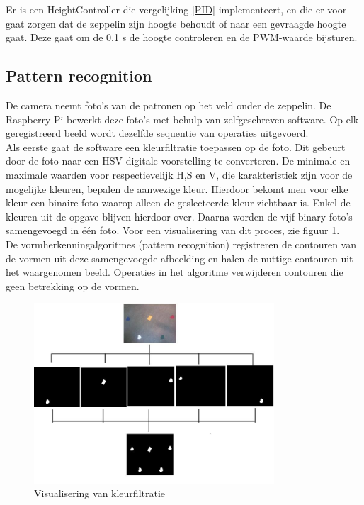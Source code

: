 \documentclass[eind]{penoverslag}
\begin{document}
Er is een HeightController die vergelijking \eqref{PID} implementeert, en die er voor gaat zorgen dat de zeppelin zijn hoogte behoudt of naar een gevraagde hoogte gaat. Deze gaat om de 0.1 s de hoogte controleren en de PWM-waarde bijsturen. \\



\subsection{Pattern recognition}
De camera neemt foto’s van de patronen op het veld onder de zeppelin. De Raspberry Pi bewerkt deze foto’s met behulp van zelfgeschreven software. Op elk geregistreerd beeld wordt dezelfde sequentie van operaties uitgevoerd. \\

Als eerste gaat de software een kleurfiltratie toepassen op de foto. Dit gebeurt door de foto naar een HSV-digitale voorstelling te converteren. De minimale en maximale waarden voor respectievelijk H,S en V, die karakteristiek zijn voor de mogelijke kleuren, bepalen de aanwezige kleur. Hierdoor bekomt men voor elke kleur een binaire foto waarop alleen de geslecteerde kleur zichtbaar is. Enkel de kleuren uit de opgave blijven hierdoor over. Daarna worden de vijf binary foto's samengevoegd in \'e\'en foto. Voor een visualisering van dit proces, zie figuur \ref{imageReco}.\\
De vormherkenningalgoritmes (pattern recognition) registreren de contouren van de vormen uit deze samengevoegde afbeelding en halen de nuttige contouren uit het waargenomen beeld. Operaties in het algoritme verwijderen contouren die geen betrekking op de vormen.\\

\begin{figure}[H]
\begin{center}
\includegraphics[width=0.8\textwidth]{imagerecognition.jpg}
\end{center}
\caption{Visualisering van kleurfiltratie}
\label{imageReco}
\end{figure}
\end{document}
